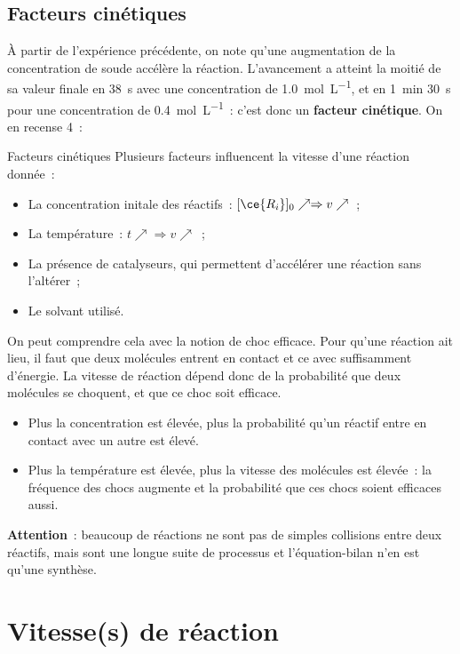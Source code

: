 \documentclass[../main/main.tex]{subfiles}
\begin{document}
\subsection{Facteurs cinétiques}

À partir de l'expérience précédente, on note qu'une augmentation de la
concentration de soude accélère la réaction. L'avancement a atteint la moitié de
sa valeur finale en \SI{38}{s} avec une concentration de \SI{1.0}{mol.L^{-1}},
et en \SI{1}{min} \SI{30}{s} pour une concentration de \SI{0.4}{mol.L^{-1}}~:
c'est donc un \textbf{facteur cinétique}. On en recense 4~:

\begin{defi}[label=def:factciné, breakable]{Facteurs cinétiques}
    Plusieurs facteurs influencent la vitesse d'une réaction donnée~:
    \begin{itemize}
        \item La concentration initale des réactifs~: $[\ce{R_i}]_0 \nearrow
            \Rightarrow v \nearrow$~;
        \item La température~: $t \nearrow \Rightarrow v \nearrow$~;
        \item La présence de catalyseurs, qui permettent d'accélérer une
            réaction sans l'altérer~;
        \item Le solvant utilisé.
    \end{itemize}
\end{defi}

On peut comprendre cela avec la notion de choc efficace. Pour qu'une réaction
ait lieu, il faut que deux molécules entrent en contact et ce avec suffisamment
d'énergie. La vitesse de réaction dépend donc de la probabilité que deux
molécules se choquent, et que ce choc soit efficace.
\begin{itemize}
    \item Plus la concentration est élevée, plus la probabilité qu'un réactif
        entre en contact avec un autre est élevé.
    \item Plus la température est élevée, plus la vitesse des molécules est
        élevée~: la fréquence des chocs augmente et la probabilité que ces chocs
        soient efficaces aussi.
\end{itemize}

\textbf{Attention}~: beaucoup de réactions ne sont pas de simples collisions
entre deux réactifs, mais sont une longue suite de processus et l'équation-bilan
n'en est qu'une synthèse.

\section{Vitesse(s) de réaction}
\end{document}
